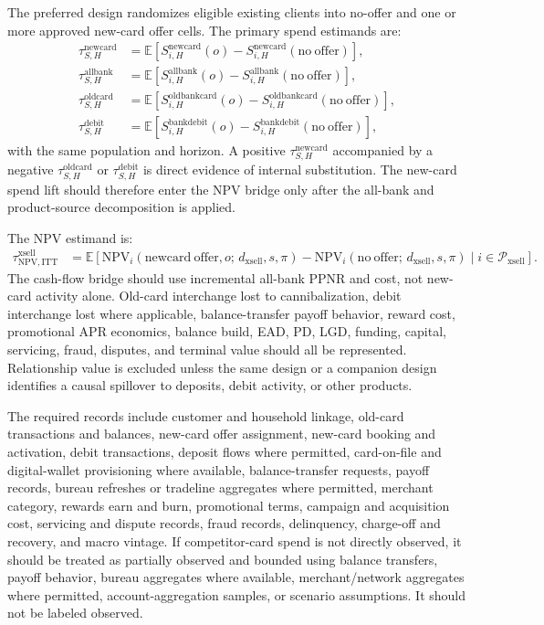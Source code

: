 \documentclass[11pt]{article}
\newcommand{\E}{\mathbb{E}}
\newcommand{\NPV}{\mathrm{NPV}}
\newcommand{\1}{\mathbf{1}}
\begin{document}
The preferred design randomizes eligible existing clients into no-offer and
one or more approved new-card offer cells. The primary spend estimands are:
\begin{align}
  \tau^{\mathrm{newcard}}_{S,H}
    &=
    \E[S^{\mathrm{newcard}}_{i,H}(o)
      -S^{\mathrm{newcard}}_{i,H}(\mathrm{no\ offer})], \\
  \tau^{\mathrm{allbank}}_{S,H}
    &=
    \E[S^{\mathrm{allbank}}_{i,H}(o)
      -S^{\mathrm{allbank}}_{i,H}(\mathrm{no\ offer})], \\
  \tau^{\mathrm{oldcard}}_{S,H}
    &=
    \E[S^{\mathrm{oldbankcard}}_{i,H}(o)
      -S^{\mathrm{oldbankcard}}_{i,H}(\mathrm{no\ offer})], \\
  \tau^{\mathrm{debit}}_{S,H}
    &=
    \E[S^{\mathrm{bankdebit}}_{i,H}(o)
      -S^{\mathrm{bankdebit}}_{i,H}(\mathrm{no\ offer})],
  \label{eq:worked-xsell-spend-estimands}
\end{align}
with the same population and horizon. A positive
$\tau^{\mathrm{newcard}}_{S,H}$ accompanied by a negative
$\tau^{\mathrm{oldcard}}_{S,H}$ or $\tau^{\mathrm{debit}}_{S,H}$ is direct
evidence of internal substitution. The new-card spend lift should therefore
enter the NPV bridge only after the all-bank and product-source decomposition
is applied.

The NPV estimand is:
\begin{align}
  \tau^{\mathrm{xsell}}_{\NPV,\mathrm{ITT}}
  &=
  \E[
    \NPV_i(\mathrm{newcard\ offer},o;\,d_{\mathrm{xsell}},s,\pi)
    -
    \NPV_i(\mathrm{no\ offer};\,d_{\mathrm{xsell}},s,\pi)
    \mid i\in\mathcal{P}_{\mathrm{xsell}}
  ].
  \label{eq:worked-xsell-npv}
\end{align}
The cash-flow bridge should use incremental all-bank PPNR and cost, not
new-card activity alone. Old-card interchange lost to cannibalization, debit
interchange lost where applicable, balance-transfer payoff behavior, reward
cost, promotional APR economics, balance build, EAD, PD, LGD, funding, capital,
servicing, fraud, disputes, and terminal value should all be represented.
Relationship value is excluded unless the same design or a companion design
identifies a causal spillover to deposits, debit activity, or other products.

The required records include customer and household linkage, old-card
transactions and balances, new-card offer assignment, new-card booking and
activation, debit transactions, deposit flows where permitted, card-on-file
and digital-wallet provisioning where available, balance-transfer requests,
payoff records, bureau refreshes or tradeline aggregates where permitted,
merchant category, rewards earn and burn, promotional terms, campaign and
acquisition cost, servicing and dispute records, fraud records, delinquency,
charge-off and recovery, and macro vintage. If competitor-card spend is not
directly observed, it should be treated as partially observed and bounded
using balance transfers, payoff behavior, bureau aggregates where available,
merchant/network aggregates where permitted, account-aggregation samples, or
scenario assumptions. It should not be labeled observed.
\end{document}
